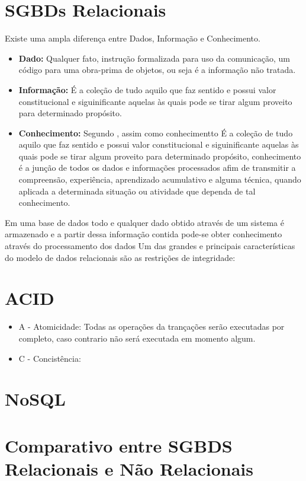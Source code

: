 \section{SGBDs Relacionais}
Existe uma ampla diferença entre Dados, Informação e Conhecimento.
\begin{itemize}
  \item{ \textbf{ Dado: } Qualquer fato, instrução formalizada para uso da comunicação, um código para uma obra-prima de objetos, ou seja é a informação não tratada.
  
  }

  \item{ \textbf{ Informação: } É a coleção de tudo aquilo que faz sentido e possui valor constitucional e siguinificante aquelas às quais pode se tirar algum proveito para determinado propósito.
  
  }
  
  \item{ \textbf{ Conhecimento: } Segundo \cite{MCLEAN_WETHERBE}, assim como conhecimentto É a coleção de tudo aquilo que faz sentido e possui valor constitucional e siguinificante 
    aquelas às quais pode se tirar algum proveito para determinado propósito, conhecimento é a junção de todos os dados e informações processados afim de transmitir
    a compreensão, experiência, aprendizado acumulativo e alguma técnica, quando aplicada a determinada situação ou atividade que dependa de tal conhecimento. 
  }
\end{itemize}

Em uma base de dados todo e qualquer dado obtido através de um sistema é armazenado e a partir dessa informação contida pode-se obter conhecimento através do processamento
dos dados 
Um das grandes e principais características do modelo de dados relacionais são as restrições de integridade:



\section{ACID}
  \begin{itemize}
    \item{ A - Atomicidade:
      Todas as operações da trançações serão executadas por completo, caso contrario não será executada em momento algum.
    }
    
    \item{ C - Concistência:
      
    }
  \end{itemize}

\section{NoSQL}

\section{Comparativo entre SGBDS Relacionais e Não Relacionais}
